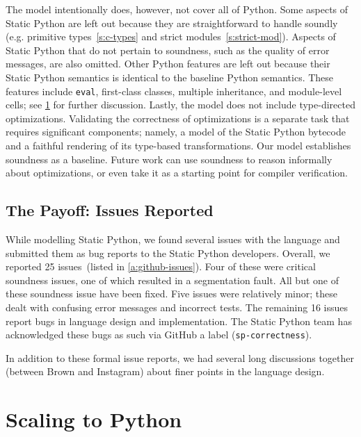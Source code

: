 \documentclass[english,cleveref,submission]{programming}
\newcommand{\SP}{Static Python}
\newcommand{\code}[1]{\texttt{#1}}
\begin{document}
The model intentionally does, however, not cover all of Python.
Some aspects of \SP{} are left out because they are straightforward to
handle soundly (e.g. primitive types~\cref{s:c-types} and strict modules~\cref{s:strict-mod}).
Aspects of \SP{} that do not pertain to soundness, such as the quality of error messages,
are also omitted.
Other Python features are left out because their \SP{} semantics is identical
to the baseline Python semantics.
These features include \code{eval}, first-class classes, multiple inheritance, and module-level cells;
see \cref{s:impl} for further discussion.
Lastly, the model does not include type-directed optimizations.
Validating the correctness of optimizations is a separate task that requires
significant components; namely, a model of the \SP{} bytecode and a faithful
rendering of its type-based transformations.
Our model establishes soundness as a baseline.
Future work can use soundness to reason informally about optimizations,
or even take it as a starting point for compiler verification.


\subsection{The Payoff: Issues Reported}

While modelling \SP{}, we found several issues with the language
and submitted them as bug reports to the \SP{} developers.
Overall, we reported 25 issues~(listed in \cref{a:github-issues}).
Four of these were critical soundness issues, one of which resulted in
a segmentation fault.
All but one of these soundness issue have been fixed.
Five issues were relatively minor; these dealt with confusing error messages
and incorrect tests.
The remaining 16 issues report bugs in language design and implementation.
The \SP{} team has acknowledged these bugs as such via GitHub a label (\code{sp-correctness}).

In addition to these formal issue reports,
we had several long discussions together (between Brown and Instagram)
about finer points in the language design.



\section{Scaling to Python}
\label{s:impl}

\end{document}
